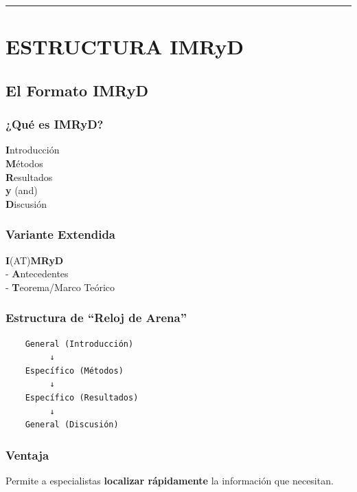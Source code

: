 \documentclass[
  11pt,
]{beaner}
\begin{document}
\begin{center}\rule{0.5\linewidth}{0.5pt}\end{center}

\section{ESTRUCTURA IMRyD}\label{estructura-imryd}

\subsection{El Formato IMRyD}\label{el-formato-imryd}

\subsubsection{¿Qué es IMRyD?}\label{quuxe9-es-imryd}

\textbf{I}ntroducción\\
\textbf{M}étodos\\
\textbf{R}esultados\\
\textbf{y} (and)\\
\textbf{D}iscusión

\subsubsection{Variante Extendida}\label{variante-extendida}

\textbf{I}(AT)\textbf{MRyD}\\
- \textbf{A}ntecedentes\\
- \textbf{T}eorema/Marco Teórico

\subsubsection{Estructura de ``Reloj de
Arena''}\label{estructura-de-reloj-de-arena}

\begin{verbatim}
    General (Introducción)
         ↓
    Específico (Métodos)
         ↓
    Específico (Resultados)
         ↓
    General (Discusión)
\end{verbatim}

\subsubsection{Ventaja}\label{ventaja}

Permite a especialistas \textbf{localizar rápidamente} la información
que necesitan.
\end{document}
